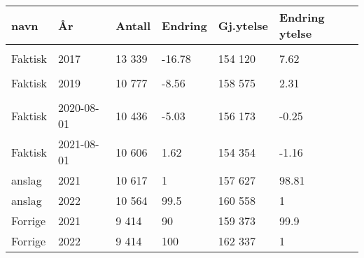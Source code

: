 \documentclass[
]{article}
\begin{document}
\begin{tabular}{llllll}
\toprule
navn & År & Antall & Endring & Gj.ytelse & Endring ytelse\\
\midrule
\cellcolor{gray!6}{Faktisk} & \cellcolor{gray!6}{2016} & \cellcolor{gray!6}{16 028} & \cellcolor{gray!6}{-13.11} & \cellcolor{gray!6}{143 210} & \cellcolor{gray!6}{5.46}\\
Faktisk & 2017 & 13 339 & -16.78 & 154 120 & 7.62\\
\cellcolor{gray!6}{Faktisk} & \cellcolor{gray!6}{2018} & \cellcolor{gray!6}{11 786} & \cellcolor{gray!6}{-11.64} & \cellcolor{gray!6}{154 994} & \cellcolor{gray!6}{0.57}\\
Faktisk & 2019 & 10 777 & -8.56 & 158 575 & 2.31\\
\cellcolor{gray!6}{Faktisk} & \cellcolor{gray!6}{2020} & \cellcolor{gray!6}{10 460} & \cellcolor{gray!6}{-2.94} & \cellcolor{gray!6}{159 526} & \cellcolor{gray!6}{0.6}\\
\addlinespace
Faktisk & 2020-08-01 & 10 436 & -5.03 & 156 173 & -0.25\\
Faktisk & 2021-08-01 & 10 606 & 1.62 & 154 354 & -1.16\\
anslag & 2021 & 10 617 & 1 & 157 627 & 98.81\\
anslag & 2022 & 10 564 & 99.5 & 160 558 & 1\\
Forrige & 2021 & 9 414 & 90 & 159 373 & 99.9\\
\addlinespace
Forrige & 2022 & 9 414 & 100 & 162 337 & 1\\
\bottomrule
\end{tabular}
\endgroup{}
\end{document}

